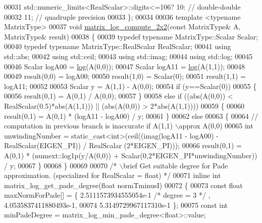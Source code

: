 \begin{DoxyCode}
00031                            std::numeric\_limits<RealScalar>::digits<=106? 10:  \textcolor{comment}{// double-double}
00032                                                                          11;  \textcolor{comment}{// quadruple precision}
00033 \};
00034 
00036 \textcolor{keyword}{template} <\textcolor{keyword}{typename} MatrixType>
00037 \textcolor{keywordtype}{void} \hyperlink{namespace_eigen_1_1internal_a1cb8d312c017f94570a52317fd1ece5f}{matrix\_log\_compute\_2x2}(\textcolor{keyword}{const} MatrixType& A, MatrixType& result)
00038 \{
00039   \textcolor{keyword}{typedef} \textcolor{keyword}{typename} MatrixType::Scalar Scalar;
00040   \textcolor{keyword}{typedef} \textcolor{keyword}{typename} MatrixType::RealScalar RealScalar;
00041   \textcolor{keyword}{using} std::abs;
00042   \textcolor{keyword}{using} std::ceil;
00043   \textcolor{keyword}{using} std::imag;
00044   \textcolor{keyword}{using} std::log;
00045 
00046   Scalar logA00 = \hyperlink{structlog}{log}(A(0,0));
00047   Scalar logA11 = \hyperlink{structlog}{log}(A(1,1));
00048 
00049   result(0,0) = logA00;
00050   result(1,0) = Scalar(0);
00051   result(1,1) = logA11;
00052 
00053   Scalar y = A(1,1) - A(0,0);
00054   \textcolor{keywordflow}{if} (y==Scalar(0))
00055   \{
00056     result(0,1) = A(0,1) / A(0,0);
00057   \}
00058   \textcolor{keywordflow}{else} \textcolor{keywordflow}{if} ((abs(A(0,0)) < RealScalar(0.5)*abs(A(1,1))) || (abs(A(0,0)) > 2*abs(A(1,1))))
00059   \{
00060     result(0,1) = A(0,1) * (logA11 - logA00) / y;
00061   \}
00062   \textcolor{keywordflow}{else}
00063   \{
00064     \textcolor{comment}{// computation in previous branch is inaccurate if A(1,1) \(\backslash\)approx A(0,0)}
00065     \textcolor{keywordtype}{int} unwindingNumber = \textcolor{keyword}{static\_cast<}\textcolor{keywordtype}{int}\textcolor{keyword}{>}(ceil((imag(logA11 - logA00) - RealScalar(EIGEN\_PI)) / RealScalar
      (2*EIGEN\_PI)));
00066     result(0,1) = A(0,1) * (numext::log1p(y/A(0,0)) + Scalar(0,2*EIGEN\_PI*unwindingNumber)) / y;
00067   \}
00068 \}
00069 
00070 \textcolor{comment}{/* \(\backslash\)brief Get suitable degree for Pade approximation. (specialized for RealScalar = float) */}
00071 \textcolor{keyword}{inline} \textcolor{keywordtype}{int} matrix\_log\_get\_pade\_degree(\textcolor{keywordtype}{float} normTminusI)
00072 \{
00073   \textcolor{keyword}{const} \textcolor{keywordtype}{float} maxNormForPade[] = \{ 2.5111573934555054e-1 \textcolor{comment}{/* degree = 3 */} , 4.0535837411880493e-1,
00074             5.3149729967117310e-1 \};
00075   \textcolor{keyword}{const} \textcolor{keywordtype}{int} minPadeDegree = matrix\_log\_min\_pade\_degree<float>::value;

\end{DoxyCode}
